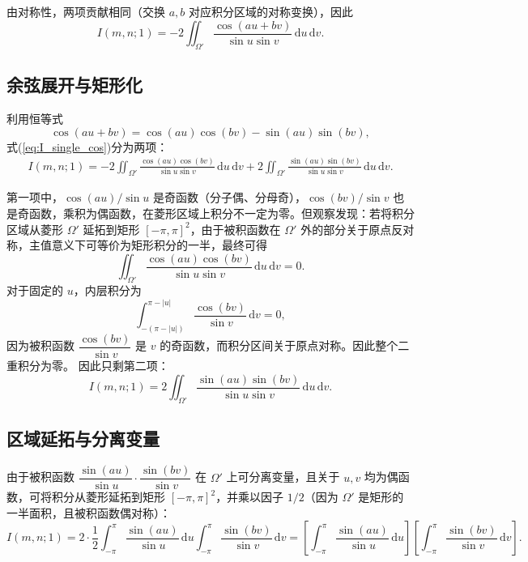 \documentclass{article} %
\newcommand{\di}{\mathrm{d}}
\begin{document}
由对称性，两项贡献相同（交换 $a,b$ 对应积分区域的对称变换），因此
\begin{equation}
    I(m,n;1)=-2\iint_{\Omega'}\frac{\cos(au+bv)}{\sin u\sin v}\,\di u\,\di v.
    \label{eq:I_single_cos}
\end{equation}

\subsection{余弦展开与矩形化}

利用恒等式
\begin{equation}
    \cos(au+bv)=\cos(au)\cos(bv)-\sin(au)\sin(bv),
    \label{eq:cos_sum_expand}
\end{equation}
式(\ref{eq:I_single_cos})分为两项：
\begin{align}
    I(m,n;1)=-2\iint_{\Omega'}\frac{\cos(au)\cos(bv)}{\sin u\sin v}\,\di u\,\di v +2\iint_{\Omega'}\frac{\sin(au)\sin(bv)}{\sin u\sin v}\,\di u\,\di v.
    \label{eq:I_two_terms}
\end{align}

第一项中，$\cos(au)/\sin u$ 是奇函数（分子偶、分母奇），$\cos(bv)/\sin v$ 也是奇函数，乘积为偶函数，在菱形区域上积分不一定为零。但观察发现：若将积分区域从菱形 $\Omega'$ 延拓到矩形 $[-\pi,\pi]^2$，由于被积函数在 $\Omega'$ 外的部分关于原点反对称，主值意义下可等价为矩形积分的一半，最终可得
\begin{equation}
    \iint_{\Omega'}\frac{\cos(au)\cos(bv)}{\sin u\sin v}\,\di u\,\di v=0.
    \label{eq:cos_cos_term_zero}
\end{equation}
对于固定的 $u$，内层积分为
\begin{equation}
    \int_{-(\pi-|u|)}^{\pi-|u|} \frac{\cos(bv)}{\sin v}\,\di v = 0,
\end{equation}
因为被积函数 $\dfrac{\cos(bv)}{\sin v}$ 是 $v$ 的奇函数，而积分区间关于原点对称。因此整个二重积分为零。
因此只剩第二项：
\begin{equation}
    I(m,n;1)=2\iint_{\Omega'}\frac{\sin(au)\sin(bv)}{\sin u\sin v}\,\di u\,\di v.
    \label{eq:I_sin_sin}
\end{equation}

\subsection{区域延拓与分离变量}


由于被积函数 $\dfrac{\sin(au)}{\sin u}\cdot\dfrac{\sin(bv)}{\sin v}$ 在 $\Omega'$ 上可分离变量，且关于 $u,v$ 均为偶函数，可将积分从菱形延拓到矩形 $[-\pi,\pi]^2$，并乘以因子 $1/2$（因为 $\Omega'$ 是矩形的一半面积，且被积函数偶对称）：
\begin{equation}
    I(m,n;1)=2\cdot\frac{1}{2}
    \int_{-\pi}^{\pi}\frac{\sin(au)}{\sin u}\,\di u
    \int_{-\pi}^{\pi}\frac{\sin(bv)}{\sin v}\,\di v
    =
    \left[\int_{-\pi}^{\pi}\dfrac{\sin(au)}{\sin u}\,\di u\right]
    \left[\int_{-\pi}^{\pi}\dfrac{\sin(bv)}{\sin v}\,\di v\right].
    \label{eq:I_separated}
\end{equation}
\end{document}

